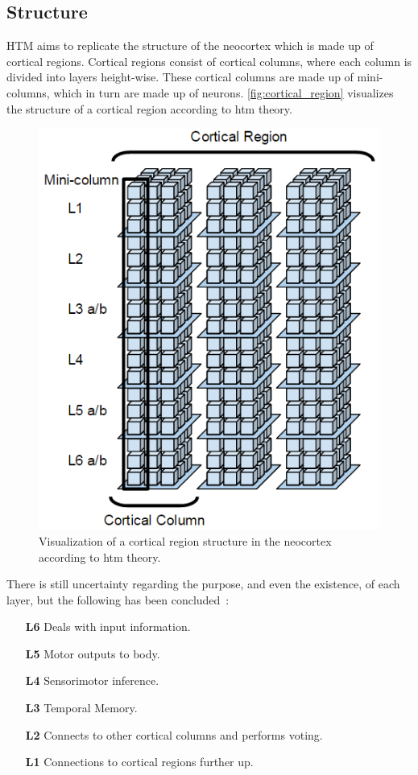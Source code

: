 \subsection{Structure}
\label{sec:htm_structure}
HTM aims to replicate the structure of the neocortex which is made up of cortical regions. Cortical regions consist of cortical columns, where each column is divided into layers height-wise. These cortical columns are made up of mini-columns, which in turn are made up of neurons. \autoref{fig:cortical_region} visualizes the structure of a cortical region according to \gls*{htm} theory.
\begin{figure}[H]
    \centering
    \includegraphics[width=\textwidth]{resources/related_works/cortical_region}
    \caption[HTM Structure]{Visualization of a cortical region structure in the neocortex according to \gls*{htm} theory.}
    \label{fig:cortical_region}
\end{figure}
There is still uncertainty regarding the purpose, and even the existence, of each layer, but the following has been concluded~\cite{htm_l2_l3,cortical_region}:
\begin{itemize}
    \item[\textbf{L6}] Deals with input information.
    \item[\textbf{L5}] Motor outputs to body.
    \item[\textbf{L4}] Sensorimotor inference.
    \item[\textbf{L3}] Temporal Memory.
    \item[\textbf{L2}] Connects to other cortical columns and performs voting.
    \item[\textbf{L1}] Connections to cortical regions further up.
\end{itemize}
